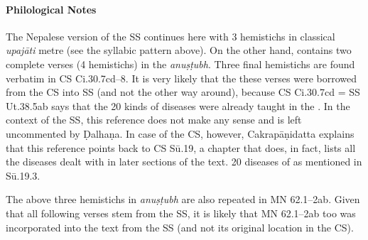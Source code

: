 \paragraph*{Philological Notes} 
The Nepalese version of the SS continues here with 3 hemistichs in classical \textit{upajāti} metre (see the syllabic pattern above). On the other hand, \cite{vulgate} contains two complete verses (4 hemistichs) in the \textit{anuṣṭubh}. Three final hemistichs are found verbatim in CS Ci.30.7cd--8. It is very likely that the these verses were borrowed from the CS into SS (and not the other way around), because CS Ci.30.7cd = SS Ut.38.5ab says that the 20 kinds of diseases were already taught in the . In the context of the SS, this reference does not make any sense and is left uncommented by Ḍalhaṇa. In case of the CS, however, Cakrapāṇidatta explains that this reference points back to CS Sū.19, a chapter that does, in fact, lists all the diseases dealt with in later sections of the text. 20 diseases of  as mentioned in Sū.19.3.

The above three hemistichs in \textit{anuṣṭubh} are also repeated in MN 62.1--2ab. Given that all following verses stem from the SS, it is likely that MN 62.1--2ab too was incorporated into the text from the SS (and not its original location in the CS).   

